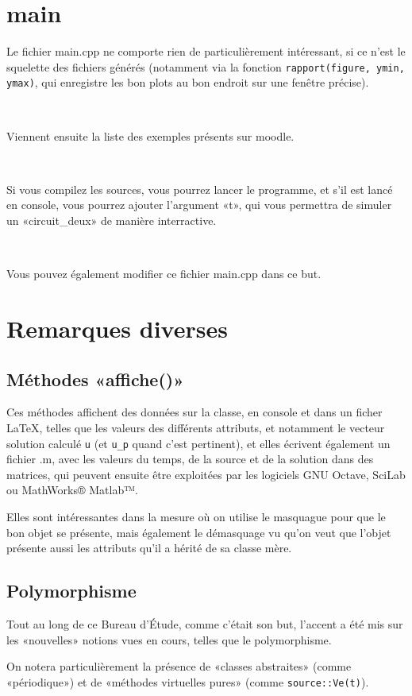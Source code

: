 \documentclass{report}
\begin{document}
\chapter{main}
Le fichier main.cpp ne comporte rien de particulièrement intéressant, si ce n’est le squelette des fichiers
générés (notamment via la fonction \verb|rapport(figure, ymin, ymax)|, qui enregistre les bon plots au bon endroit
sur une fenêtre précise).

~

Viennent ensuite la liste des exemples présents sur moodle.

~

Si vous compilez les sources, vous pourrez lancer le programme, et s’il est lancé en console, vous pourrez
ajouter l’argument «t», qui vous permettra de simuler un «circuit\_deux» de manière interractive.

~

Vous pouvez également modifier ce fichier main.cpp dans ce but.

\chapter{Remarques diverses}
\section{Méthodes «affiche()»}
Ces méthodes affichent des données sur la classe, en console et dans un ficher \LaTeX, telles que les valeurs
des différents attributs, et notamment le vecteur solution calculé \verb|u| (et \verb|u_p| quand c’est pertinent),
et elles écrivent également un fichier .m, avec les valeurs du temps, de la source et de la solution dans des matrices,
qui peuvent ensuite être exploitées par les logiciels GNU Octave, SciLab ou MathWorks® Matlab™.

Elles sont intéressantes dans la mesure où on utilise le masquague pour que le bon objet se présente, mais également
le démasquage vu qu’on veut que l’objet présente aussi les attributs qu’il a hérité de sa classe mère.

\section{Polymorphisme}
Tout au long de ce Bureau d’Étude, comme c’était son but, l’accent a été mis sur les «nouvelles» notions vues en cours,
telles que le polymorphisme.

On notera particulièrement la présence de «classes abstraites» (comme «périodique») et de «méthodes virtuelles pures»
(comme \verb|source::Ve(t)|).
\end{document}
